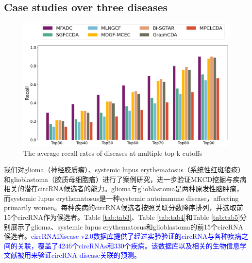 \documentclass{bioinfo}
\begin{document}
\begin{methods}
\subsection{Case studies over three diseases}

\begin{figure}[!t]
    \centering
    \includegraphics[width=6.5in]{fig/TopK_Recall.png}
     \caption{The average recall rates of diseases at multiple top k cutoffs}
    \label{fig:topK}
\end{figure}

我们对glioma（神经胶质瘤）、systemic lupus erythematosus（系统性红斑狼疮）和glioblastoma（胶质母细胞瘤）进行了案例研究，进一步验证MKCD挖掘与疾病相关的潜在circRNA候选者的能力。glioma与glioblastoma是两种原发性脑肿瘤\cite{weller2015glioma,wirsching2017glioblastoma}，而systemic lupus erythematosus是一种systemic autoimmune disease，affecting primarily women\cite{borchers2010geoepidemiology}。每种疾病的circRNA候选者按照关联分数降序排列，并选取前15个circRNA作为候选者。Table \ref{tab:tab3}、Table \ref{tab:tab4}和Table \ref{tab:tab5}分别展示了glioma、systemic lupus erythematosus和glioblastoma的前15个circRNA候选者。\textcolor{blue}{circRNADisease v2.0数据库提供了经过实验验证的circRNA与各种疾病之间的关联，覆盖了4246个circRNAs和330个疾病\cite{sun2024mode}。该数据库以及相关的生物信息学文献被用来验证circRNA-disease关联的预测。}


\end{methods}
\end{document}
